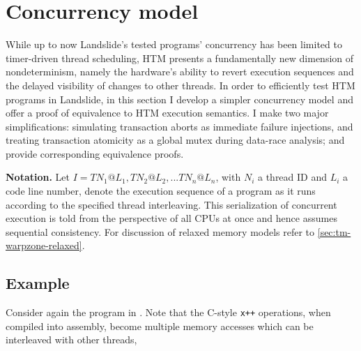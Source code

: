 
\section{Concurrency model}
\label{sec:tm-design}

While up to now Landslide's tested programs' concurrency has been limited to timer-driven thread scheduling,
HTM presents a fundamentally new dimension of nondeterminism,
namely the hardware's ability to revert execution sequences
and the delayed visibility of changes to other threads.
In order to efficiently test HTM programs in Landslide,
in this section
I develop a simpler concurrency model and offer a proof of equivalence to HTM execution semantics.
I make two major simplifications:
simulating transaction aborts as immediate failure injections,
and treating transaction atomicity as a global mutex during data-race analysis;
and provide corresponding equivalence proofs.

{\bf Notation.} Let $I = TN_1@L_1, TN_2@L_2, ... TN_n@L_n$,
with $N_i$ a thread ID and $L_i$ a code line number,
denote the execution sequence of a program as it runs according to the specified thread interleaving.
This serialization of concurrent execution is told from the perspective of all CPUs at once
and hence assumes sequential consistency.
For discussion of relaxed memory models refer to \cref{sec:tm-warpzone-relaxed}.

\subsection{Example}

Consider again the program in .
Note that the C-style {\tt x++} operations, when compiled into assembly, %
become multiple memory accesses which can be interleaved with other threads,

